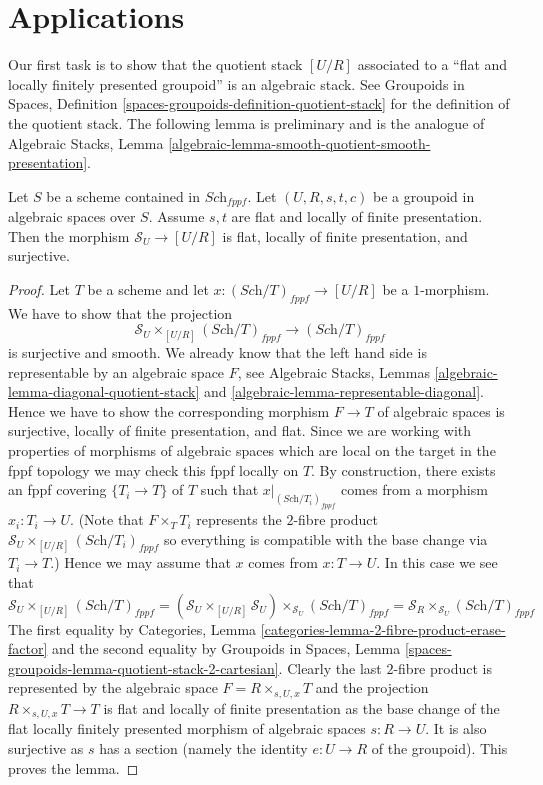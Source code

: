 \section{Applications}
\label{section-applications}

\noindent
Our first task is to show that the quotient stack $[U/R]$ associated to
a ``flat and locally finitely presented groupoid'' is an algebraic stack.
See
Groupoids in Spaces,
Definition \ref{spaces-groupoids-definition-quotient-stack}
for the definition of the quotient stack.
The following lemma is preliminary and is the analogue of
Algebraic Stacks,
Lemma \ref{algebraic-lemma-smooth-quotient-smooth-presentation}.

\begin{lemma}
\label{lemma-flat-quotient-flat-presentation}
Let $S$ be a scheme contained in $\textit{Sch}_{fppf}$.
Let $(U, R, s, t, c)$ be a groupoid in algebraic spaces over $S$.
Assume $s, t$ are flat and locally of finite presentation.
Then the morphism $\mathcal{S}_U \to [U/R]$ is flat, locally of
finite presentation, and surjective.
\end{lemma}

\begin{proof}
Let $T$ be a scheme and let $x : (\textit{Sch}/T)_{fppf} \to [U/R]$
be a $1$-morphism. We have to show that the projection
$$
\mathcal{S}_U \times_{[U/R]} (\textit{Sch}/T)_{fppf}
\longrightarrow
(\textit{Sch}/T)_{fppf}
$$
is surjective and smooth. We already know that the left hand side
is representable by an algebraic space $F$, see
Algebraic Stacks, Lemmas \ref{algebraic-lemma-diagonal-quotient-stack} and
\ref{algebraic-lemma-representable-diagonal}.
Hence we have to show the corresponding morphism $F \to T$ of
algebraic spaces is surjective, locally of finite presentation, and flat.
Since we are working with properties of morphisms of algebraic
spaces which are local on the target in the fppf topology we
may check this fppf locally on $T$. By construction, there exists
an fppf covering $\{T_i \to T\}$ of $T$ such that
$x|_{(\textit{Sch}/T_i)_{fppf}}$ comes from a morphism
$x_i : T_i \to U$. (Note that $F \times_T T_i$ represents the
$2$-fibre product $\mathcal{S}_U \times_{[U/R]} (\textit{Sch}/T_i)_{fppf}$
so everything is compatible with the base change via $T_i \to T$.)
Hence we may assume that $x$ comes from $x : T \to U$.
In this case we see that
$$
\mathcal{S}_U \times_{[U/R]} (\textit{Sch}/T)_{fppf}
=
(\mathcal{S}_U \times_{[U/R]} \mathcal{S}_U)
\times_{\mathcal{S}_U} (\textit{Sch}/T)_{fppf}
=
\mathcal{S}_R \times_{\mathcal{S}_U} (\textit{Sch}/T)_{fppf}
$$
The first equality by
Categories, Lemma \ref{categories-lemma-2-fibre-product-erase-factor}
and the second equality by
Groupoids in Spaces,
Lemma \ref{spaces-groupoids-lemma-quotient-stack-2-cartesian}.
Clearly the last $2$-fibre product is represented by the algebraic
space $F = R \times_{s, U, x} T$ and the projection
$R \times_{s, U, x} T \to T$ is flat and locally of finite presentation
as the base change of the flat locally finitely presented
morphism of algebraic spaces $s : R \to U$.
It is also surjective as $s$ has a section (namely the identity
$e : U \to R$ of the groupoid).
This proves the lemma.
\end{proof}

